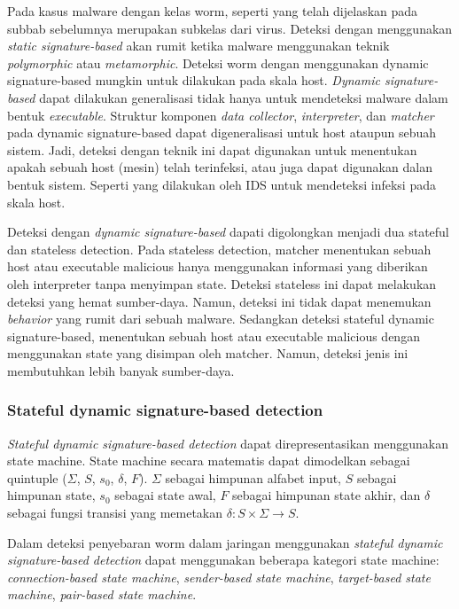 Pada kasus malware dengan kelas worm, seperti yang telah dijelaskan pada subbab sebelumnya merupakan subkelas dari virus. Deteksi dengan menggunakan \textit{static signature-based} akan rumit ketika malware menggunakan teknik \textit{polymorphic} atau \textit{metamorphic}. Deteksi worm dengan menggunakan dynamic signature-based mungkin untuk dilakukan pada skala host. \textit{Dynamic signature-based} dapat dilakukan generalisasi tidak hanya untuk mendeteksi malware dalam bentuk \textit{executable}. Struktur komponen \textit{data collector}, \textit{interpreter}, dan \textit{matcher} pada dynamic signature-based dapat digeneralisasi untuk host ataupun sebuah sistem. Jadi, deteksi dengan teknik ini dapat digunakan untuk menentukan apakah sebuah host (mesin) telah terinfeksi, atau juga dapat digunakan dalan bentuk sistem. Seperti yang dilakukan oleh IDS untuk mendeteksi infeksi pada skala host.

Deteksi dengan \textit{dynamic signature-based} dapati digolongkan menjadi dua stateful dan stateless detection. Pada stateless detection, matcher menentukan sebuah host atau executable malicious hanya menggunakan informasi yang diberikan oleh interpreter tanpa menyimpan state. Deteksi stateless ini dapat melakukan deteksi yang hemat sumber-daya. Namun, deteksi ini tidak dapat menemukan \textit{behavior} yang rumit dari sebuah malware. Sedangkan deteksi stateful dynamic signature-based, menentukan sebuah host atau executable malicious dengan menggunakan state yang disimpan oleh matcher. Namun, deteksi jenis ini membutuhkan lebih banyak sumber-daya.

\subsubsection{Stateful dynamic signature-based detection}

\textit{Stateful dynamic signature-based detection} dapat direpresentasikan menggunakan state machine. State machine secara matematis dapat dimodelkan sebagai quintuple ($\Sigma$, $S$, $s_0$, $\delta$, $F$). $\Sigma$ sebagai himpunan alfabet input, $S$ sebagai himpunan state, $s_0$ sebagai state awal, $F$ sebagai himpunan state akhir, dan $\delta$ sebagai fungsi transisi yang memetakan $\delta : S \times \Sigma \rightarrow S$. 

Dalam deteksi penyebaran worm dalam jaringan menggunakan \textit{stateful dynamic signature-based detection} dapat menggunakan beberapa kategori state machine: \textit{connection-based state machine}, \textit{sender-based state machine}, \textit{target-based state machine}, \textit{pair-based state machine}.

